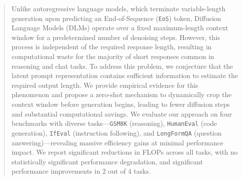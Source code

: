 \documentclass{article}
\theoremstyle{plain}
\theoremstyle{definition}
\theoremstyle{remark}
\begin{document}
\begin{abstract}
Unlike autoregressive language models, which terminate variable-length generation upon predicting an End-of-Sequence (\verb|EoS|) token, Diffusion Language Models (DLMs) operate over a fixed maximum-length context window for a predetermined number of denoising steps. However, this process is independent of the required response length, resulting in computational waste for the majority of short responses common in reasoning and chat tasks.
To address this problem, we conjecture that the latent prompt representation contains sufficient information to estimate the required output length. We provide empirical evidence for this phenomenon and propose a zero-shot mechanism to dynamically crop the context window before generation begins, leading to fewer diffusion steps and substantial computational savings.
We evaluate our approach on four benchmarks with diverse tasks---\verb|GSM8K| (reasoning), \verb|HumanEval| (code generation), \verb|IfEval| (instruction following), and \verb|LongFormQA| (question answering)---revealing massive efficiency gains at minimal performance impact. We report significant reductions in FLOPs across all tasks, with no statistically significant performance degradation, and significant performance improvements in 2 out of 4 tasks.
\end{abstract}


\end{document}
